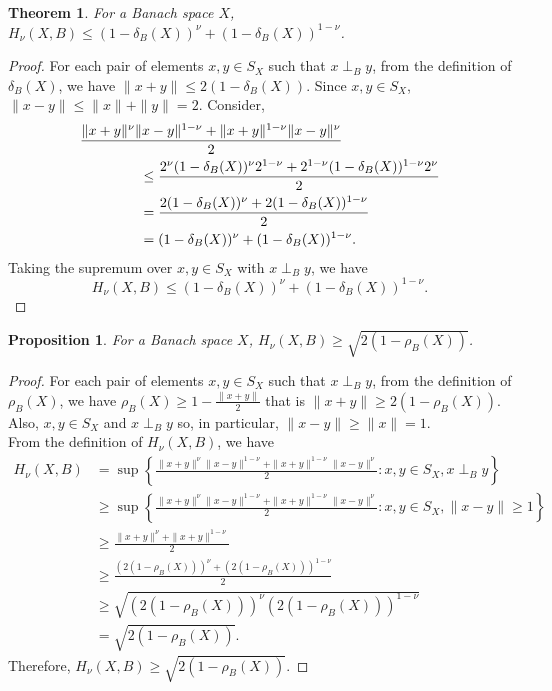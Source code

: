 \documentclass[preprint,12pt]{elsarticle}
\newtheorem{theorem}{Theorem}[section]
\newtheorem{proposition}[thm]{Proposition}
\numberwithin{equation}{section}
\begin{document}
\begin{theorem}
 For a Banach space $X$, $H_{\nu}(X,B)\leq (1-\delta_B(X))^{\nu}+(1-\delta_B(X))^{1-\nu}$.   
\end{theorem}
\begin{proof}
For each pair of elements $x, y \in S_X$ such that $x\perp_B y$,  from the definition of $\delta_B(X)$, we have
$\|x + y\|\leq 2(1-\delta_B(X))$. Since $x, y \in S_X$, $\|x-y\|\leq \|x\|+\|y\|=2$. 
Consider, 
\begin{align*}
 &\frac{\|x+y\|^{\nu}\|x-y\|^{1-\nu} + \|x+y\|^{1-\nu}\|x-y\|^{\nu}}{2}\\
 &\hspace{1.5cm}\leq \frac{2^{\nu}(1-\delta_B(X))^{\nu}2^{1-\nu}+2^{1-\nu}(1-\delta_B(X))^{1-\nu}2^{\nu}}{2}\\
 &\hspace{1.5cm}= \frac{2(1-\delta_B(X))^{\nu}+2(1-\delta_B(X))^{1-\nu}}{2}\\
 &\hspace{1.5cm}=(1-\delta_B(X))^{\nu}+(1-\delta_B(X))^{1-\nu}.
 \end{align*}
Taking the supremum over $x,y \in S_X$ with $x\perp_B y$, we have
\[H_{\nu}(X,B)\leq (1-\delta_B(X))^{\nu}+(1-\delta_B(X))^{1-\nu}.\]
\end{proof}
\begin{proposition}
 For a Banach space $X$, $H_{\nu}(X,B)\geq\sqrt{2(1-\rho_B(X))}$.   
\end{proposition}
\begin{proof}
For each pair of elements $x, y \in S_X$ such that $x\perp_B y$,  from the definition of $\rho_B(X)$, we have $\rho_B(X)\geq 1-\frac{\|x+y\|}{2}$ that is $\|x+y\|\geq 2(1-\rho_B(X))$. Also, $x,y\in S_X$ and $x\perp_B y$ so, in particular, $\|x-y\|\geq \|x\|=1$. \\
From the definition of $H_{\nu}(X,B)$, we have
\begin{align*}
H_{\nu}(X,B)&= \sup\left\{\frac{\|x+y\|^{\nu}\|x-y\|^{1-\nu} + \|x+y\|^{1-\nu}\|x-y\|^{\nu}}{2}: x,y \in S_X, x\perp_B y\right\}\\
 &\geq \sup\left\{\frac{\|x+y\|^{\nu}\|x-y\|^{1-\nu} + \|x+y\|^{1-\nu}\|x-y\|^{\nu}}{2}: x,y \in S_X, \|x-y\|\geq 1 \right\}\\
&\geq \frac{\|x+y\|^{\nu} + \|x+y\|^{1-\nu}}{2}\\
 &\geq \frac{(2(1-\rho_B(X)))^{\nu}+(2(1-\rho_B(X)))^{1-\nu}}{2}\\
 &\geq \sqrt{(2(1-\rho_B(X)))^{\nu}(2(1-\rho_B(X)))^{1-\nu}}\\
 &=\sqrt{2(1-\rho_B(X))}.
 \end{align*}
 Therefore, $H_{\nu}(X,B)\geq\sqrt{2(1-\rho_B(X))}$.
\end{proof}
\end{document}
